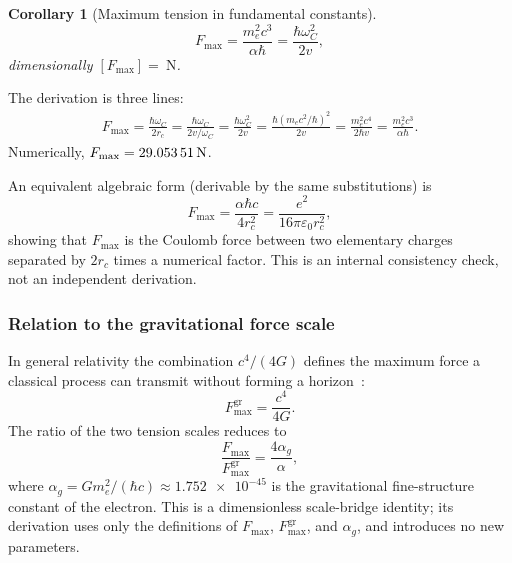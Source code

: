 \documentclass[aps,pra,preprint,longbibliography,nofootinbib]{revtex4-2}
\newtheorem{corollary}{Corollary}
\newcommand{\vc}{v}              %
\newcommand{\rc}{r_c}            %
\newcommand{\omC}{\omega_C}      %
\newcommand{\Fmax}{F_{\max}}     %
\begin{document}
\begin{corollary}[Maximum tension in fundamental constants]
\label{cor:Fmax}
\begin{equation}
  \Fmax = \frac{m_e^2 c^3}{\alpha\hbar}
        = \frac{\hbar\omC^2}{2\vc},
  \label{eq:Fmax}
\end{equation}
dimensionally $[\Fmax] = \SI{}{\newton}$.
\end{corollary}

The derivation is three lines:
\begin{align}
  \Fmax = \frac{\hbar\omC}{2\rc}
        = \frac{\hbar\omC}{2\vc/\omC}
        = \frac{\hbar\omC^2}{2\vc}
        = \frac{\hbar(m_e c^2/\hbar)^2}{2\vc}
        = \frac{m_e^2 c^4}{2\hbar\vc}
        = \frac{m_e^2 c^3}{\alpha\hbar}.
\end{align}
Numerically, $\Fmax = \SI{29.053\,51}{\newton}$.

An equivalent algebraic form (derivable by the same substitutions) is
\begin{equation}
  \Fmax = \frac{\alpha\hbar c}{4\rc^2}
         = \frac{e^2}{16\pi\varepsilon_0\rc^2},
  \label{eq:Fmax_em}
\end{equation}
showing that $\Fmax$ is the Coulomb force between two elementary
charges separated by $2\rc$ times a numerical factor.
This is an internal consistency check, not an independent derivation.

\subsubsection*{Relation to the gravitational force scale}

In general relativity the combination $c^4/(4G)$ defines the maximum
force a classical process can transmit without forming a
horizon~\cite{Gibbons2002,Schiller2006}:
\begin{equation}
  \Fmax^{\mathrm{gr}} = \frac{c^4}{4G}.
  \label{eq:Fgr}
\end{equation}
The ratio of the two tension scales reduces to
\begin{equation}
  \frac{\Fmax}{\Fmax^{\mathrm{gr}}}
  = \frac{4\alpha_g}{\alpha},
  \label{eq:tension_ratio}
\end{equation}
where $\alpha_g = Gm_e^2/(\hbar c) \approx \num{1.752e-45}$ is the
gravitational fine-structure constant of the electron.
This is a dimensionless scale-bridge identity; its derivation uses
only the definitions of $\Fmax$, $\Fmax^{\mathrm{gr}}$, and $\alpha_g$,
and introduces no new parameters.
\end{document}
